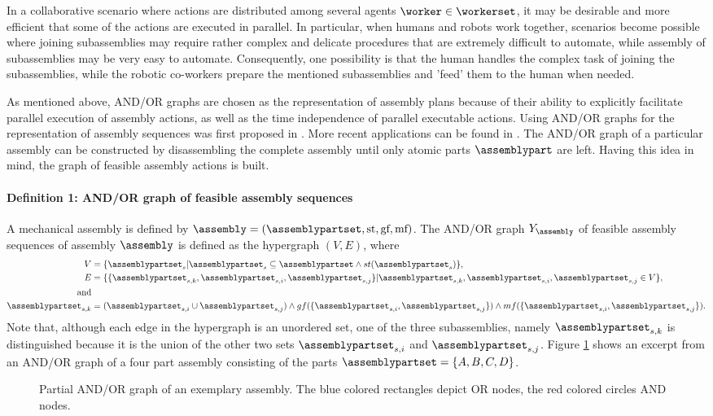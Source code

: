 In a collaborative scenario where actions are distributed among several agents $\worker \in \workerset$, it may be desirable and more efficient that some of the actions are executed in parallel.
In particular, when humans and robots work together, scenarios become possible where joining subassemblies may require rather complex and delicate procedures that are extremely difficult to automate, while assembly of subassemblies may be very easy to automate.
Consequently, one possibility is that the human handles the complex task of joining the subassemblies, while the robotic co-workers prepare the mentioned subassemblies and 'feed' them to the human when needed.

As mentioned above, AND/OR graphs are chosen as the representation of assembly plans because of their ability to explicitly facilitate parallel execution of assembly actions, as well as the time independence of parallel executable actions.
Using AND/OR graphs for the representation of assembly sequences was first proposed in \cite{HomemdeMello.1990}.
More recent applications can be found in \cite{Koc.2009}.
The AND/OR graph of a particular assembly can be constructed by disassembling the complete assembly until only atomic parts $\assemblypart$ are left.
Having this idea in mind, the graph of feasible assembly actions is built.

\paragraph{Definition 1: AND/OR graph of feasible assembly sequences}
A mechanical assembly is defined by $\assembly=(\assemblypartset,\text{st},\text{gf},\text{mf})$.
The AND/OR graph $Y_\assembly$ of feasible assembly sequences of assembly $\assembly$ is defined as the hypergraph $(V,E)$, where
\begin{align*} V &= \{ \assemblypartset_s \vert \assemblypartset_s \subseteq \assemblypartset \land st(\assemblypartset_s) \} {\rm{,}} \\ E & = \{ \{ \assemblypartset_{s,k}, \assemblypartset_{s,i}, \assemblypartset_{s,j} \} \vert \assemblypartset_{s,k}, \assemblypartset_{s,i}, \assemblypartset_{s,j} \in V \} {\rm{,}} \\ \text{and}\\ \assemblypartset_{s,k} & = (\assemblypartset_{s,i} \cup \assemblypartset_{s,j}) \land gf(\{ \assemblypartset_{s,i}, \assemblypartset_{s,j} \}) \land mf(\{ \assemblypartset_{s,i}, \assemblypartset_{s,j} \}).
\end{align*}
Note that, although each edge in the hypergraph is an unordered set, one of the three subassemblies, namely $\assemblypartset_{s,k}$ is distinguished because it is the union of the other two sets $\assemblypartset_{s,i}$ and $\assemblypartset_{s,j}$.
Figure \ref{fig:foundations:planning:andor_example} shows an excerpt from an AND/OR graph of a four part assembly consisting of the parts $\assemblypartset=\{A,B,C,D\}$. 

\begin{figure}[ht!]
\begin{center}

\caption{Partial AND/OR graph of an exemplary assembly.
The blue colored rectangles depict OR nodes, the red colored circles AND nodes.}
\label{fig:foundations:planning:andor_example}
\end{center}
\end{figure}